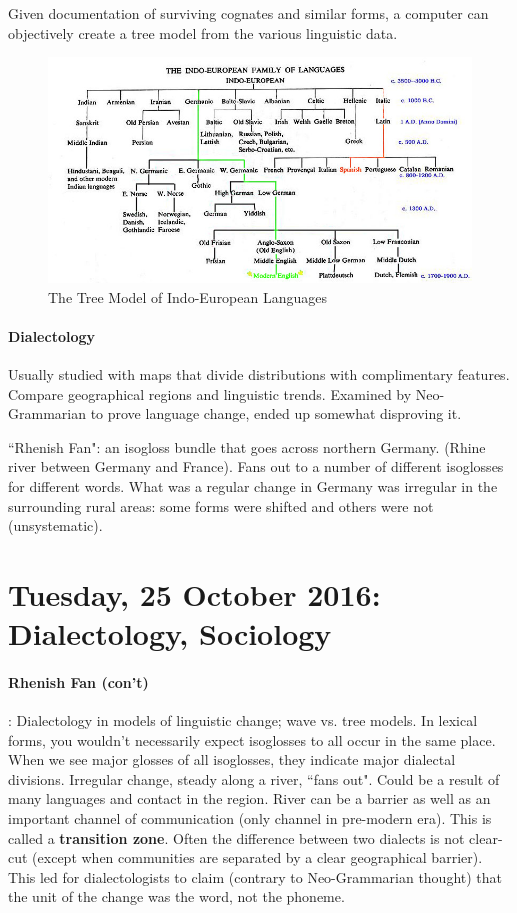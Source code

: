 \documentclass{exam}
\begin{document}
Given documentation of surviving cognates and similar forms, a computer can objectively create a tree model from the various linguistic data. 

\begin{figure}[h!]
\centering
\includegraphics[scale=.6]{treemodel.jpg}
\caption{The Tree Model of Indo-European Languages}
\label{fig:download}
\end{figure}

\paragraph{Dialectology} Usually studied with maps that divide distributions with complimentary features. Compare geographical regions and linguistic trends. Examined by Neo-Grammarian to prove language change, ended up somewhat disproving it. 

``Rhenish Fan": an isogloss bundle that goes across northern Germany. (Rhine river between Germany and France). Fans out to a number of different isoglosses for different words. What was a regular change in Germany was irregular in the surrounding rural areas: some forms were shifted and others were not (unsystematic). 

\section*{Tuesday, 25 October 2016: Dialectology, Sociology}

\paragraph{Rhenish Fan (con't)}: Dialectology in models of linguistic change; wave vs. tree models. In lexical forms, you wouldn't necessarily expect isoglosses to all occur in the same place. When we see major glosses of all isoglosses, they indicate major dialectal divisions. Irregular change, steady along a river, ``fans out". Could be a result of many languages and contact in the region. River can be a barrier as well as an important channel of communication (only channel in pre-modern era). This is called a \textbf{transition zone}. Often the difference between two dialects is not clear-cut (except when communities are separated by a clear geographical barrier). This led for dialectologists to claim (contrary to Neo-Grammarian thought) that the unit of the change was the word, not the phoneme. 
\end{document}
